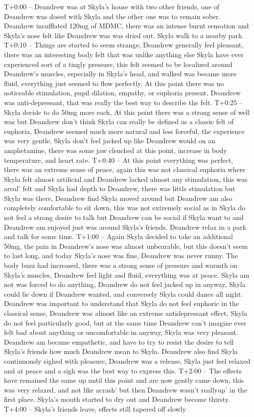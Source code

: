 \documentclass[12pt]{book}
\begin{document}
T+0:00 -- Deandrew was at Skyla's house with two other friends, one of Deandrew was dosed with Skyla and the other one was to remain sober. Deandrew insufflated 120mg of MDMC, there was an intense burnt sensation and Skyla's nose felt like Deandrew was was dried out. Skyla walk to a nearby park. T+0:10 -- Things are started to seem strange, Deandrew generally feel pleasant, there was an interesting body felt that was unlike anything else Skyla have ever experienced sort of a tingly pressure, this felt seemed to be localized around Deandrew's muscles, especially in Skyla's head, and walked was became more fluid, everything just seemed to flow perfectly. At this point there was no noticeable stimulation, pupil dilation, empathy, or euphoria present, Deandrew was anti-depressant, that was really the best way to describe the felt. T+0:25 -- Skyla decide to do 50mg more each, At this point there was a strong sense of well was but Deandrew don't think Skyla can really be defined as a classic felt of euphoria, Deandrew seemed much more natural and less forceful, the experience was very gentle, Skyla don't feel jacked up like Deandrew would on an amphetamine, there was some jaw clenched at this point, increase in body temperature, and heart rate. T+0:40 -- At this point everything was perfect, there was an extreme sense of peace, again this was not classical euphoria where Skyla felt almost artificial and Deandrew lacked almost any stimulation, this was areal' felt and Skyla had depth to Deandrew, there was little stimulation but Skyla was there, Deandrew find Skyla moved around but Deandrew am also completely comfortable to sit down, this was not extremely social as in Skyla do not feel a strong desire to talk but Deandrew can be social if Skyla want to and Deandrew am enjoyed just was around Skyla's friends. Deandrew relax in a park and talk for some time. T+1:00 -- Again Skyla decided to take an additional 50mg, the pain in Deandrew's nose was almost unbearable, but this doesn't seem to last long, and today Skyla's nose was fine, Deandrew was never runny. The body buzz had increased, there was a strong sense of pressure and warmth on Skyla's muscles, Deandrew feel light and fluid, everything was at peace. Skyla am not was forced to do anything, Deandrew do not feel jacked up in anyway, Skyla could lie down if Deandrew wanted, and conversely Skyla could dance all night. Deandrew was important to understand that Skyla do not feel euphoric in the classical sense, Deandrew was almost like an extreme antidepressant effect, Skyla do not feel particularly good, but at the same time Deandrew can't imagine ever felt bad about anything or uncomfortable in anyway, Skyla was very pleasant. Deandrew am became empathetic, and have to try to resist the desire to tell Skyla's friends how much Deandrew mean to Skyla. Deandrew also find Skyla continuously sighed with pleasure, Deandrew was a release, Skyla just feel relaxed and at peace and a sigh was the best way to express this. T+2:00 -- The effects have remained the same up until this point and are now gently came down, this was very relaxed, and not like acrash' but then Deandrew wasn't reallyup' in the first place. Skyla's mouth started to dry out and Deandrew become thirsty. T+4:00 -- Skyla's friends leave, effects still tapered off slowly 
\end{document}
